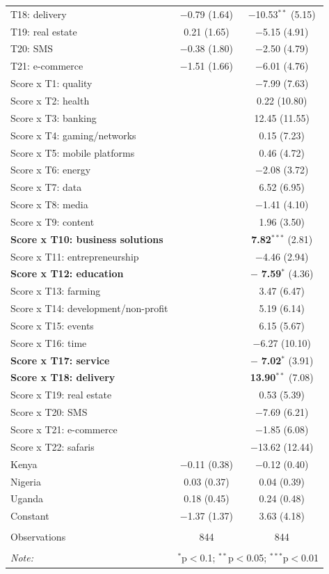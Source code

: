 \documentclass[12pt]{article}
\begin{document}
\begin{table}[!htbp]
\begin{tabular}{@{\extracolsep{5pt}}lcc}
  T18: delivery & $-$0.79 (1.64) & $-$10.53$^{**}$ (5.15) \\ 
  T19: real estate & 0.21 (1.65) & $-$5.15 (4.91) \\ 
  T20: SMS & $-$0.38 (1.80) & $-$2.50 (4.79) \\ 
  T21: e-commerce & $-$1.51 (1.66) & $-$6.01 (4.76) \\ 
  Score x T1: quality &  & $-$7.99 (7.63) \\ 
  Score x T2: health &  & 0.22 (10.80) \\ 
  Score x T3: banking &  & 12.45 (11.55) \\ 
  Score x T4: gaming/networks &  & 0.15 (7.23) \\ 
  Score x T5: mobile platforms &  & 0.46 (4.72) \\ 
  Score x T6: energy &  & $-$2.08 (3.72) \\ 
  Score x T7: data &  & 6.52 (6.95) \\ 
  Score x T8: media &  & $-$1.41 (4.10) \\ 
  Score x T9: content &  & 1.96 (3.50) \\ 
  \textbf{Score x T10: business solutions} &  & \textbf{7.82}$^{***}$ (2.81) \\ 
  Score x T11: entrepreneurship &  & $-$4.46 (2.94) \\ 
  \textbf{Score x T12: education} &  & $-$ \textbf{7.59}$^{*}$ (4.36) \\ 
  Score x T13: farming &  & 3.47 (6.47) \\ 
  Score x T14: development/non-profit &  & 5.19 (6.14) \\ 
  Score x T15: events &  & 6.15 (5.67) \\ 
  Score x T16: time &  & $-$6.27 (10.10) \\ 
  \textbf{Score x T17: service} &  & $-$ \textbf{7.02}$^{*}$ (3.91) \\ 
  \textbf{Score x T18: delivery} &  &  \textbf{13.90}$^{**}$ (7.08) \\ 
  Score x T19: real estate &  & 0.53 (5.39) \\ 
  Score x T20: SMS &  & $-$7.69 (6.21) \\ 
  Score x T21: e-commerce &  & $-$1.85 (6.08) \\ 
  Score x T22: safaris &  & $-$13.62 (12.44) \\ 
  Kenya & $-$0.11 (0.38) & $-$0.12 (0.40) \\ 
  Nigeria & 0.03 (0.37) & 0.04 (0.39) \\ 
  Uganda & 0.18 (0.45) & 0.24 (0.48) \\ 
  Constant & $-$1.37 (1.37) & 3.63 (4.18) \\ 
 \hline \\[-1.8ex] 
Observations & 844 & 844 \\ 
\hline 
\hline \\[-1.8ex] 
\textit{Note:}  & \multicolumn{2}{r}{$^{*}$p$<$0.1; $^{**}$p$<$0.05; $^{***}$p$<$0.01} \\ 
\end{tabular} 
\end{table} 
\end{document}
